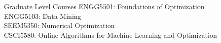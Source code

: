 \begin{rSection}{Graduate Level Courses}
    ENGG5501: Foundations of Optimization \\ 
    ENGG5103: Data Mining \\
    SEEM5350: Numerical Optimization \\
    CSCI5580: Online Algorithms for Machine Learning and Optimization \\
\end{rSection}
